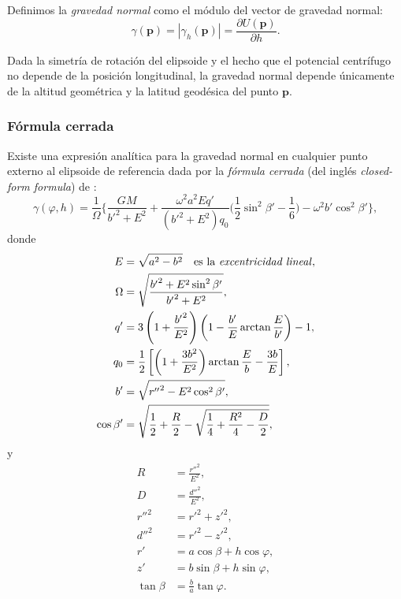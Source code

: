 Definimos la \emph{gravedad normal} como el módulo del vector de gravedad
normal:
%
\begin{equation}
    \gamma(\mathbf{p}) = | \gamma_h(\mathbf{p}) | =
        \frac{\partial U(\mathbf{p})}{\partial h}.
\end{equation}

Dada la simetría de rotación del elipsoide y el hecho que el potencial
centrífugo no depende de la posición longitudinal, la gravedad normal depende
únicamente de la altitud geométrica y la latitud geodésica del punto
$\mathbf{p}$.

\subsubsection{Fórmula cerrada}
\label{sec:normal-gravity-closed-form}

Existe una expresión analítica para la gravedad normal en cualquier punto
externo al elipsoide de referencia dada por la \emph{fórmula cerrada} (del
inglés \emph{closed-form formula}) de \citet{li2001a}:
%
\begin{equation}
    \gamma(\varphi, h) =
    \frac{1}{\Omega}
    \Bigg\{
        \frac{G M}{{b'}^2 + E^2}
        + \frac{\omega^2 a^2 E q'}{({b'}^2 + E^2) q_0}
        \Bigg(
            \frac{1}{2}
            \sin^2 \beta' - \frac{1}{6}
        \Bigg)
        - \omega^2 b' \cos^2 \beta'
    \Bigg\},
    \label{eq:normal-gravity-closed-form}
\end{equation}
%
donde
%
\begin{align}
    E &= \sqrt{a^2 - b^2}
        \quad \text{es la \emph{excentricidad lineal}}, \\
    \Omega &= \sqrt{\frac{{b'}^2 + E^2 \sin^2 \beta'}{{b'}^2 + E^2}}, \\
    q' &= 3
        \left(1 + \frac{{b'}^2}{E^2} \right)
        \left(1 - \frac{b'}{E} \arctan \frac{E}{b'} \right)
        - 1, \\
    q_0 &= \frac{1}{2}
        \left[
            \left(
                1 + \frac{3b^2}{E^2}
            \right)
            \arctan \frac{E}{b} - \frac{3b}{E}
        \right], \\
    b' &= \sqrt{{r''}^2 - E^2 \cos^2 \beta'}, \\
    \cos \beta' &= \sqrt{
        \frac{1}{2}
        + \frac{R}{2}
        - \sqrt{
            \frac{1}{4} + \frac{R^2}{4}  - \frac{D}{2}
        }
    },
\end{align}
%
y
%
\begin{align}
    R &= \frac{{r''}^2}{E^2}, \\
    D &= \frac{{d''}^2}{E^2}, \\
    {r''}^2 &= {r'}^2 + {z'}^2, \\
    {d''}^2 &= {r'}^2 - {z'}^2, \\
    r' &= a\cos\beta + h\cos\varphi, \\
    z' &= b\sin\beta + h\sin\varphi, \\
    \tan\beta &= \frac{b}{a}\tan\varphi.
\end{align}

